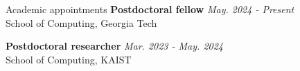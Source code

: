 \begin{rSection}{Academic appointments}
\textbf{Postdoctoral fellow} \hfill {\em May. 2024 - Present} \\
  School of Computing, Georgia Tech

\textbf{Postdoctoral researcher} \hfill {\em Mar. 2023 - May. 2024} \\
  School of Computing, KAIST
\end{rSection}

